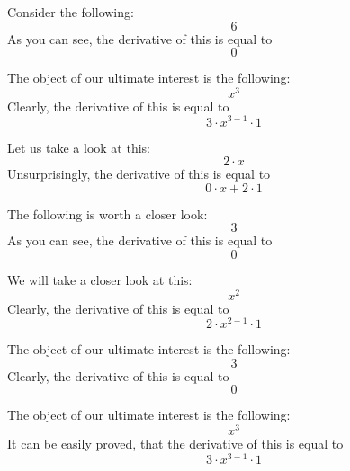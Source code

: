 \documentclass{article}
\begin{document}
Consider the following:
\begin{equation}
6 
\end{equation}
As you can see, the derivative of this is equal to
\begin{equation}
0 
\end{equation}

The object of our ultimate interest is the following:
\begin{equation}
x ^{3 } 
\end{equation}
Clearly, the derivative of this is equal to
\begin{equation}
3 \cdot x ^{3 - 1 } \cdot 1 
\end{equation}

Let us take a look at this:
\begin{equation}
2 \cdot x 
\end{equation}
Unsurprisingly, the derivative of this is equal to
\begin{equation}
0 \cdot x + 2 \cdot 1 
\end{equation}

The following is worth a closer look:
\begin{equation}
3 
\end{equation}
As you can see, the derivative of this is equal to
\begin{equation}
0 
\end{equation}

We will take a closer look at this:
\begin{equation}
x ^{2 } 
\end{equation}
Clearly, the derivative of this is equal to
\begin{equation}
2 \cdot x ^{2 - 1 } \cdot 1 
\end{equation}

The object of our ultimate interest is the following:
\begin{equation}
3 
\end{equation}
Clearly, the derivative of this is equal to
\begin{equation}
0 
\end{equation}

The object of our ultimate interest is the following:
\begin{equation}
x ^{3 } 
\end{equation}
It can be easily proved, that the derivative of this is equal to
\begin{equation}
3 \cdot x ^{3 - 1 } \cdot 1 
\end{equation}
\end{document}

